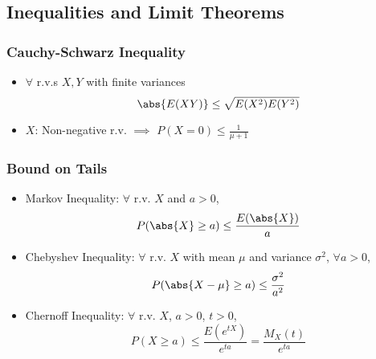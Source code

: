 \subsection{Inequalities and Limit Theorems}

\subsubsection*{Cauchy-Schwarz Inequality}
\begin{itemize}
    \item $\forall$ r.v.s $X,Y$ with finite variances
    \begin{equation}
        \abs{E(XY)}\leq\sqrt{E(X^2)E(Y^2)}
    \end{equation}
    \item $X$: Non-negative r.v. $\implies$ $P(X=0)\leq\frac{1}{\mu+1}$
\end{itemize}

\subsubsection*{Bound on Tails}
\begin{itemize}
    \item Markov Inequality: $\forall$ r.v. $X$ and $a>0$,
    \begin{equation}
        P(\abs{X}\geq a)\leq\frac{E(\abs{X})}{a}
    \end{equation}
    \item Chebyshev Inequality: $\forall$ r.v. $X$ with mean $\mu$ and variance $\sigma^2$, $\forall a>0$,
    \begin{equation}
        P(\abs{X-\mu}\geq a)\leq\frac{\sigma^2}{a^2}
    \end{equation}
    \item Chernoff Inequality: $\forall$ r.v. $X$, $a>0$, $t>0$,
    \begin{equation}
        P(X\geq a)\leq\frac{E\left(e^{tX}\right)}{e^{ta}}=\frac{M_X(t)}{e^{ta}}
    \end{equation}
\end{itemize}

